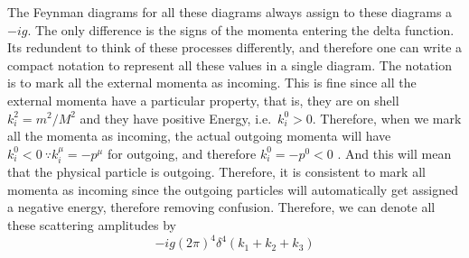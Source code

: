 \documentclass[11pt, notitlepage]{report}
\numberwithin{equation}{section}
\begin{document}
    The Feynman diagrams for all these diagrams always assign to these diagrams a \(-ig\). The only difference is the signs of the momenta entering the delta function. Its redundent to think of these processes differently, and therefore one can write a compact notation to represent all these values in a single diagram. The notation is to mark all the external momenta as incoming. This is fine since all the external momenta have a particular property, that is, they are on shell \(k_i^2 = m^2/M^2\) and they have positive Energy, i.e.\ \(k_i^0 > 0\). Therefore, when we mark all the momenta as incoming, the actual outgoing momenta will have \(k_i^0<0~\because k_i^\mu = -p^\mu\) for outgoing, and therefore \(k_i^0 = -p^0 < 0\) . And this will mean that the physical particle is outgoing. Therefore, it is consistent to mark all momenta as incoming since the outgoing particles will automatically get assigned a negative energy, therefore removing confusion. Therefore, we can denote all these scattering amplitudes by 
    \begin{equation*}
        -ig(2\pi)^4\delta^4(k_1 + k_2 + k_3)
    \end{equation*}
\end{document}
